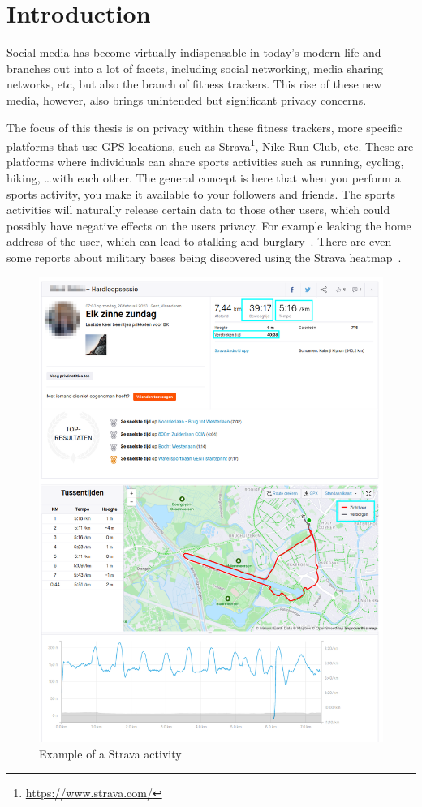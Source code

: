 \documentclass[conference]{IEEEtran}
\begin{document}
\section{\textbf{Introduction}}
Social media has become virtually indispensable in today's modern life and
branches out into a lot of facets, including social networking, media sharing
networks, etc, but also the branch of fitness trackers. This rise of these new
media, however, also brings unintended but significant privacy concerns.

The focus of this thesis is on privacy within these fitness trackers, more
specific platforms that use GPS locations, such as
Strava\footnote{\label{fn:strava}\url{https://www.strava.com/}}, Nike Run Club,
etc. These are platforms where individuals can share sports activities such as
running, cycling, hiking, \ldots with each other. The general concept is here
that when you perform a sports activity, you make it available to your
followers and friends. The sports activities will naturally release certain
data to those other users, which could possibly have negative effects on the
users privacy. For example leaking the home address of the user, which can lead
to stalking and burglary~\cite{Sportapp72:online, Cyclistw89:online}. There are
even some reports about military bases being discovered using the Strava
heatmap~\cite{Fitnesst33:online}.
\begin{figure}[h]
    \centering
    \includegraphics[width=\linewidth]{fig/VoorbeeldActiviteiten/VoorbeeldActiviteit_Personal.png}
    \caption{Example of a Strava activity}\label{fig:activity}
\end{figure}
\end{document}
